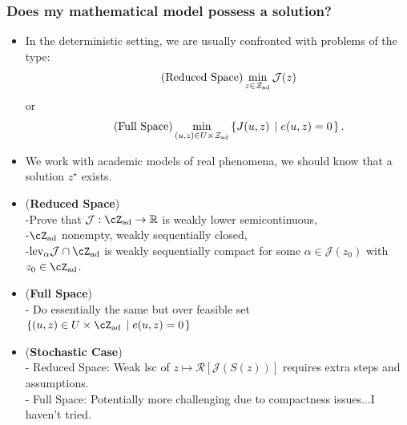 \documentclass[aspectratio=169,xcolor=dvipsnames,10pt]{beamer}
\newcommand{\cJ}{\mathcal{J}}
\newcommand{\risk}{\mathcal{R}}
\begin{document}
\begin{frame}\frametitle{Does my mathematical model possess a solution?}
\begin{block}{}
\begin{itemize}
\item In the deterministic setting, we are usually confronted with problems of the type:
\begin{equation}\label{eq:rs}\tag{Reduced Space}
\min_{z \in \mathcal{Z}_{\rm ad}} \mathcal{J}(z) 
\end{equation}
or 
\begin{equation}\label{eq:fs}\tag{Full Space}
\min_{(u,z) \in U \times \mathcal{Z}_{\rm ad}} \left\{ J(u,z) \; \left| \; e(u,z) = 0\right.\right\}.
\end{equation}
\item  We work with academic models of real phenomena, we should know that a solution $z^{\star}$ exists.\pause
\item (\textbf{Reduced Space})\\ 
-Prove that $\cJ : \cZ_{\rm ad} \to \mathbb R$ is weakly lower semicontinuous,\\
-$\cZ_{\rm ad}$ nonempty, weakly sequentially closed,\\
-$\mathrm{lev}_{\alpha} \cJ \cap \cZ_{\rm ad}$  is weakly sequentially compact for some $\alpha \in \cJ(z_0)$ with $z_0 \in \cZ_{\rm ad}$.\pause
\item (\textbf{Full Space})\\
- Do essentially the same but over feasible set $\left\{ (u,z) \in U \times \cZ_{\rm ad}  \; \left| \; e(u,z) = 0 \right.\right\}$\pause
\item \alert{(\textbf{Stochastic Case})}\\
- Reduced Space: Weak lsc of $z \mapsto \risk[\cJ(S(z))]$ requires extra steps and assumptions.\\
-  Full Space: Potentially more challenging due to compactness issues...I haven't tried.
\end{itemize}
\end{block}
\end{frame}
\end{document}
